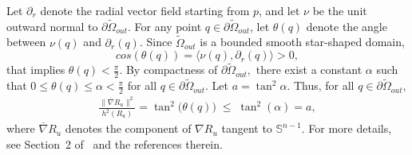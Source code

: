 \documentclass[12pt,reqno]{amsart}
\numberwithin{equation}{section}
\numberwithin{theorem}{section}
\numberwithin{equation}{section}
\numberwithin{theorem}{section}
\begin{document}
Let $\partial_r$ denote the radial vector field starting from $p$, and let $\nu $ be the unit outward normal to $\partial \tilde{\Omega}_{out}.$ For any point $q\in \partial \tilde{\Omega}_{out}$, let $\theta(q)$ denote the angle between $\nu (q)$ and $\partial_r(q)$. Since $\tilde{\Omega}_{out}$ is a bounded smooth star-shaped domain,
$$ cos(\theta(q))=\langle \nu (q), \partial_r(q)\rangle >0, $$
that implies 
$\theta(q)<\frac{\pi}{2}$. By compactness of $\partial\tilde{\Omega}_{out},$ there exist a constant $\alpha$ such that $0\leq \theta(q)\leq \alpha < \frac{\pi}{2}$ for all $q\in \partial \tilde{\Omega}_{out}.$  Let $a = \tan^{2} \alpha$.
Thus, for all $q \in \partial \tilde{\Omega}_{out}$,  
\begin{align} \label{eqn: constt a}
  \frac{\|\overline{\nabla} R_u \|^2}{h^2(R_u)} 
= \tan^{2}\!\big(\theta(q)\big) 
\;\leq\; \tan^{2}(\alpha) = a,  
\end{align}
where $\overline{\nabla} R_u$ denotes the component of $\nabla R_u$ tangent to $\mathbb{S}^{n-1}$. For more details, see Section~2 of~\cite{Basak_Chorwadwala_Verma_2025} and the references therein.
\end{document}
